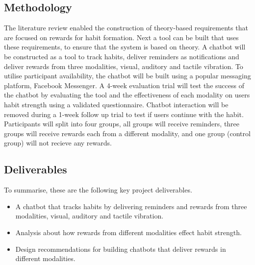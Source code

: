 \subsection*{Methodology}
The literature review enabled the construction of theory-based requirements that are focused on rewards for habit formation. Next a tool can be built that uses these requirements, to ensure that the system is based on theory. A chatbot will be constructed as a tool to track habits, deliver reminders as notifications and deliver rewards from three modalities, visual, auditory and tactile vibration. To utilise participant availability, the chatbot will be built using a popular messaging platform, Facebook Messenger.\newline
\newline
A 4-week evaluation trial will test the success of the chatbot by evaluating the tool and the effectiveness of each modality on users habit strength using a validated questionnaire. Chatbot interaction will be removed during a 1-week follow up trial to test if users continue with the habit. Participants will split into four groups, all groups will receive reminders, three groups will receive rewards each from a different modality, and one group (control group) will not recieve any rewards.

\newpage
\subsection*{Deliverables}
To summarise, these are the following key project deliverables.

\begin{itemize}
  \item A chatbot that tracks habits by delivering reminders and rewards from three modalities, visual, auditory and tactile vibration.
  \item Analysis about how rewards from different modalities effect habit strength.
  \item Design recommendations for building chatbots that deliver rewards in different modalities.
\end{itemize}

